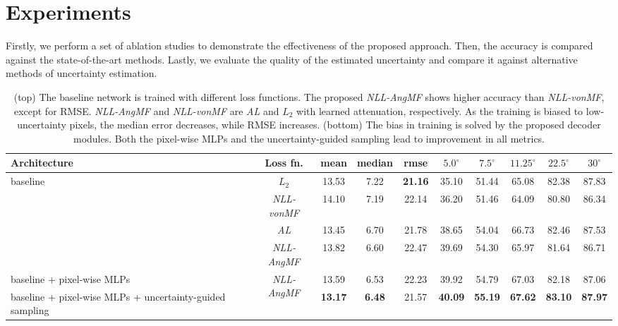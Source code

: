 \documentclass[10pt,twocolumn,letterpaper]{article}
\begin{document}
\section{Experiments}

Firstly, we perform a set of ablation studies to demonstrate the effectiveness of the proposed approach. Then, the accuracy is compared against the state-of-the-art methods. Lastly, we evaluate the quality of the estimated uncertainty and compare it against alternative methods of uncertainty estimation.

\begin{table*}[t]
\setlength\tabcolsep{1.5pt}
\begin{center}
\begin{tabular}{l|c|ccc|ccccc}
\hline
\toprule
Architecture & Loss fn. & mean & median & rmse & $5.0^{\circ}$ & $7.5^{\circ}$ & $11.25^{\circ}$ & $22.5^{\circ}$ & $30^{\circ}$ \\
\midrule
\multirow{3}{*}{\small baseline} & {\small $L_2$}
& 13.53 & 7.22 & \textbf{21.16} & 35.10 & 51.44 & 65.08 & 82.38 & 87.83\\
\multirow{3}{*}{\small (convolutional encoder-decoder with skip connections \cite{adabins})} & {\small \textit{NLL-vonMF}} & 14.10 & 7.19 & 22.14 & 36.20 & 51.46 & 64.09 & 80.80 & 86.34\\
\cline{2-10}
& {\small \textit{AL}} & 13.45 & 6.70 & 21.78 & 38.65 & 54.04 & 66.73 & 82.46 & 87.53\\
& {\small \textit{NLL-AngMF}} & 13.82 & 6.60 & 22.47 & 39.69 & 54.30 & 65.97 & 81.64 & 86.71 \\
\hline
\hline
{\small baseline + pixel-wise MLPs} & \multirow{2}{*}{\small \textit{NLL-AngMF}} & 13.59 & 6.53 & 22.23 & 39.92 & 54.79 & 67.03 & 82.18 & 87.06 \\
{\small baseline + pixel-wise MLPs + uncertainty-guided sampling} & & 
\textbf{13.17} & \textbf{6.48} & 21.57 & \textbf{40.09} & \textbf{55.19} & \textbf{67.62} & \textbf{83.10} & \textbf{87.97} \\
\bottomrule
\end{tabular}
\end{center}
\caption{(top) The baseline network is trained with different loss functions. The proposed \textit{NLL-AngMF} shows higher accuracy than \textit{NLL-vonMF}, except for RMSE. \textit{NLL-AngMF} and \textit{NLL-vonMF} are \textit{AL} and $L_2$ with learned attenuation, respectively. As the training is biased to low-uncertainty pixels, the median error decreases, while RMSE increases. (bottom) The bias in training is solved by the proposed decoder modules. Both the pixel-wise MLPs and the uncertainty-guided sampling lead to improvement in all metrics.}
\label{table:ablation1}
\end{table*}
\end{document}
